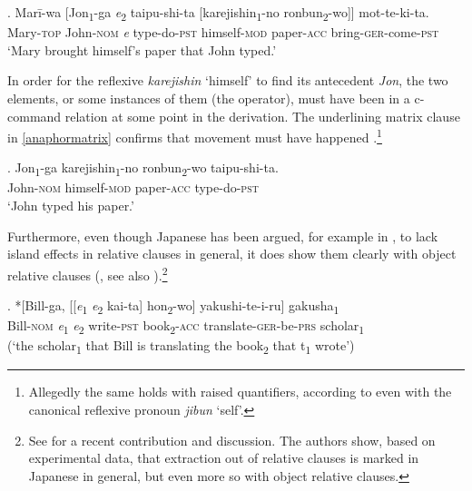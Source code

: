 \exg. Marī-wa [Jon\textsubscript{1}-ga \textit{e}\textsubscript{2} taipu-shi-ta [karejishin\textsubscript{1}-no ronbun\textsubscript{2}-wo]] mot-te-ki-ta.\\
Mary-\textsc{top} John-\textsc{nom} \textit{e} type-do-\textsc{pst} himself-\textsc{mod} paper-\textsc{acc} bring-\textsc{ger}-come-\textsc{pst}\\
`Mary brought himself's paper that John typed.’ \\ \null \hfill \citep[615]{miyamoto:2017:RC} \label{anaphorbinding}

In order for the reflexive \textit{karejishin} `himself’ to find its antecedent \textit{Jon}, the two elements, or some instances of them (the operator), must have been in a c-command relation at some point in the derivation. The underlining matrix clause in \ref{anaphormatrix} confirms that movement must have happened \citep[615–616]{miyamoto:2017:RC}.\footnote{Allegedly the same holds with raised quantifiers, according to \citet{whitman:2013:prehead} even with the canonical reflexive pronoun \textit{jibun} `self’.} 

\exg. Jon\textsubscript{1}-ga karejishin\textsubscript{1}-no ronbun\textsubscript{2}-wo taipu-shi-ta.\\
John-\textsc{nom} himself-\textsc{mod} paper-\textsc{acc} type-do-\textsc{pst}\\
`John typed his paper.’ \label{anaphormatrix}

Furthermore, even though Japanese has been argued, for example in \citet{kuno:1973:structure}, to lack island effects in relative clauses in general, it does show them clearly with object relative clauses (\citealt[623–626]{miyamoto:2017:RC}, see also \citealt[369–373]{whitman:2013:prehead}).\footnote{See \citet{takahashi:2025:relative} for a recent contribution and discussion. The authors show, based on experimental data, that extraction out of relative clauses is marked in Japanese in general, but even more so with object relative clauses.}

\exg. *[Bill-ga, [[\textit{e}\textsubscript{1} \textit{e}\textsubscript{2} kai-ta] hon\textsubscript{2}-wo] yakushi-te-i-ru] gakusha\textsubscript{1}\\
Bill-\textsc{nom} \textit{e}\textsubscript{1} \textit{e}\textsubscript{2} write-\textsc{pst} book\textsubscript{2}-\textsc{acc} translate-\textsc{ger}-be-\textsc{prs} scholar\textsubscript{1}\\
(`the scholar\textsubscript{1} that Bill is translating the book\textsubscript{2} that t\textsubscript{1} wrote’) \\ \null \hfill \citep[178]{inoue:1976:togo} \label{islandjapanese}

